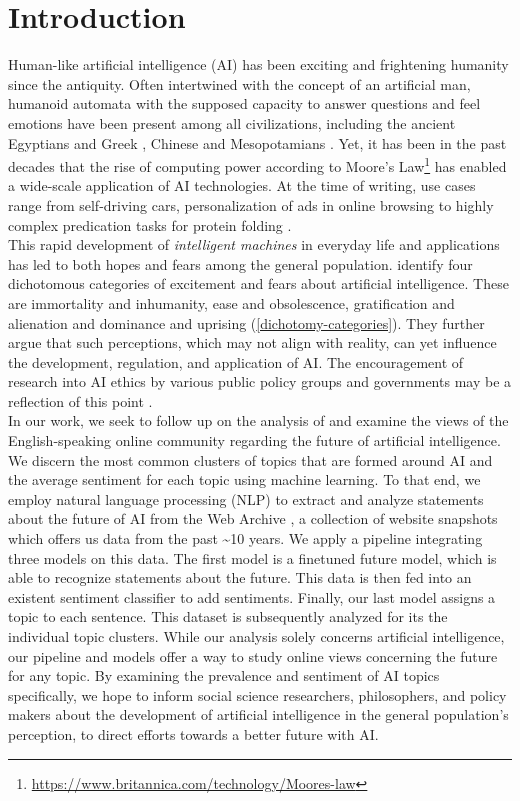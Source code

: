 \section{Introduction}

Human-like artificial intelligence (AI) has been exciting and frightening humanity since the antiquity.
Often intertwined with the concept of an artificial man, humanoid automata with the supposed capacity to answer questions and feel emotions have been present among all civilizations, including the ancient Egyptians and Greek \citep{Newquist1994}, Chinese \citep{cohen1986} and Mesopotamians \citep{unat2008}.
Yet, it has been in the past decades that the rise of computing power according to Moore’s Law\footnote{\url{https://www.britannica.com/technology/Moores-law}} has enabled a wide-scale application of AI technologies.
At the time of writing, use cases range from self-driving cars, personalization of ads in online browsing to highly complex predication tasks for protein folding \citep{jumper2021}.
\\
This rapid development of \emph{intelligent machines} in everyday life and applications has led to both hopes and fears among the general population.
\citet{cave2019} identify four dichotomous categories of excitement and fears about artificial intelligence.
These are immortality and inhumanity, ease and obsolescence, gratification and alienation and dominance and uprising (\autoref{dichotomy-categories}).
They further argue that such perceptions, which may not align with reality, can yet influence the development, regulation, and application of AI.
The encouragement of research into AI ethics by various public policy groups and governments may be a reflection of this point \citep{leslie2019}.
\\
In our work, we seek to follow up on the analysis of \citet{cave2019} and examine the views of the English-speaking online community regarding the future of artificial intelligence. We discern the most common clusters of topics that are formed around AI and the average sentiment for each topic using machine learning. To that end, we employ natural language processing (NLP) to extract and analyze statements about the future of AI from the Web Archive \citep{Deckers2022}, a collection of website snapshots which offers us data from the past \textasciitilde10 years.
We apply a pipeline integrating three models on this data.
The first model is a finetuned future model, which is able to recognize statements about the future.
This data is then fed into an existent sentiment classifier to add sentiments.
Finally, our last model assigns a topic to each sentence.
This dataset is subsequently analyzed for its the individual topic clusters.
While our analysis solely concerns artificial intelligence, our pipeline and models offer a way to study online views concerning the future for any topic. By examining the prevalence and sentiment of AI topics specifically, we hope to inform social science researchers, philosophers, and policy makers about the development of artificial intelligence in the general population’s perception, to direct efforts towards a better future with AI.

